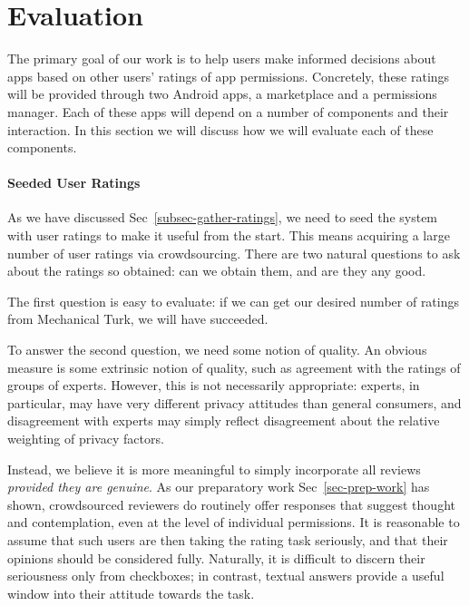 \documentclass[11pt]{article}
\begin{document}
\section{Evaluation}
\label{sec-eval}

The primary goal of our work is to help users make informed decisions
about apps based on other users' ratings of app permissions.
Concretely, these ratings will be provided through two Android apps, a
marketplace and a permissions manager. Each of these apps will
depend on a number of components and their interaction. In this
section we will discuss how we will evaluate each of these components.

\paragraph{Seeded User Ratings}

As we have discussed Sec~\ref{subsec-gather-ratings}, we need to seed the system with user
ratings to make it useful from the start. This means acquiring a large
number of user ratings via crowdsourcing. There are two natural
questions to ask about the ratings so obtained: can we obtain them,
and are they any good.

The first question is easy to evaluate: if we can get our desired
number of ratings from Mechanical Turk, we will have succeeded. 

To answer the second question, we need some notion of quality. An
obvious measure is some extrinsic notion of quality, such as agreement
with the ratings of groups of experts. However, this is not
necessarily appropriate: experts, in particular, may have very
different privacy attitudes than general consumers, and disagreement
with experts may simply reflect disagreement about the relative
weighting of privacy factors.

Instead, we believe it is more meaningful to simply incorporate all
reviews \emph{provided they are genuine}. As our preparatory work
Sec~\ref{sec-prep-work} has shown, crowdsourced reviewers do routinely offer responses
that suggest thought and contemplation, even at the level of
individual permissions. It is reasonable to assume that such users are
then taking the rating task seriously, and that their opinions should
be considered fully. Naturally, it is difficult to discern their
seriousness only from checkboxes; in contrast, textual answers provide
a useful window into their attitude towards the task. 
\end{document}
